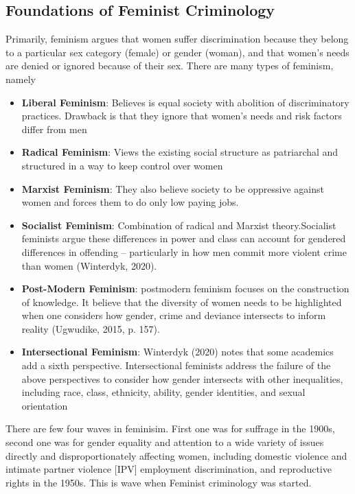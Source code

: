 \documentclass{article}
\begin{document}
\subsection{Foundations of Feminist Criminology}

Primarily, feminism argues that women suffer discrimination because they belong to a particular sex category (female) or gender (woman), and that women’s needs are denied or ignored because of their sex. There are many types of feminism, namely

\begin{itemize}
    \item \textbf{Liberal Feminism}: Believes is equal society with abolition of discriminatory practices. Drawback is that they ignore that women's needs and risk factors differ from men
    \item \textbf{Radical Feminism}: Views the existing social structure as patriarchal and structured in a way to keep control over women
    \item \textbf{Marxist Feminism}: They also believe society to be oppressive against women and forces them to do only low paying jobs.
    \item \textbf{Socialist Feminism}: Combination of radical and Marxist theory.Socialist feminists argue these differences in power and class can account for gendered differences in offending – particularly in how men commit more violent crime than women (Winterdyk, 2020).
    \item \textbf{Post-Modern Feminism}: postmodern feminism focuses on the construction of knowledge. It believe that the diversity of women needs to be highlighted when one considers how gender, crime and deviance intersects to inform reality (Ugwudike, 2015, p. 157).
    \item \textbf{Intersectional Feminism}: Winterdyk (2020) notes that some academics add a sixth perspective. Intersectional feminists address the failure of the above perspectives to consider how gender intersects with other inequalities, including race, class, ethnicity, ability, gender identities, and sexual orientation
\end{itemize}

There are few four waves in feminisim. First one was for suffrage in the 1900s, second one was for gender equality and attention to a wide variety of issues directly and disproportionately affecting women, including domestic violence and intimate partner violence [IPV] employment discrimination, and reproductive rights in the 1950s. This is wave when Feminist criminology was started.
\end{document}
